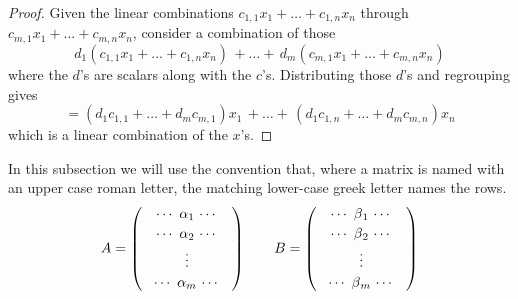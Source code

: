 \begin{proof}
Given the linear combinations 
$c_{1,1}x_1+\dots+c_{1,n}x_n$ through $c_{m,1}x_1+\dots+c_{m,n}x_n$,
consider a combination of those
\begin{equation*}
  d_1(c_{1,1}x_1+\dots+c_{1,n}x_n)\,+\dots+\,d_m(c_{m,1}x_1+\dots+c_{m,n}x_n)
\end{equation*}
where the $d$'s are scalars along with the $c$'s.
Distributing those $d$'s and regrouping gives
\begin{equation*}
  =(d_1c_{1,1}+\dots+d_mc_{m,1})x_1\,+\dots+\,(d_1c_{1,n}+\dots+d_mc_{m,n})x_n
\end{equation*}
which is a linear combination of the $x$'s.
\end{proof}

In this subsection we will use the convention
that, where a matrix is named with an upper case roman letter,
the matching lower-case greek letter names the rows.
\begin{equation*}
  A=
    \begin{pmatrix}
      \makebox[2.25cm]{$\cdots$\ $\alpha_1$\ $\cdots$}   \\[.5ex]
      \makebox[2.25cm]{$\cdots$\ $\alpha_2$\ $\cdots$}   \\[.5ex]
      \vdots                                                     \\[.5ex]
      \makebox[2.25cm]{$\cdots$\ $\alpha_m$\ $\cdots$}   
    \end{pmatrix}
  \qquad
  B=
    \begin{pmatrix}
      \makebox[2.25cm]{$\cdots$\ $\smash[b]{\beta}_1$\ $\cdots$}  \\[.5ex]
      \makebox[2.25cm]{$\cdots$\ $\smash[b]{\beta}_2$\ $\cdots$}  \\[.5ex]
      \vdots                                                    \\[.5ex]
      \makebox[2.25cm]{$\cdots$\ $\smash[b]{\beta}_m$\ $\cdots$}  
    \end{pmatrix}
\end{equation*}

